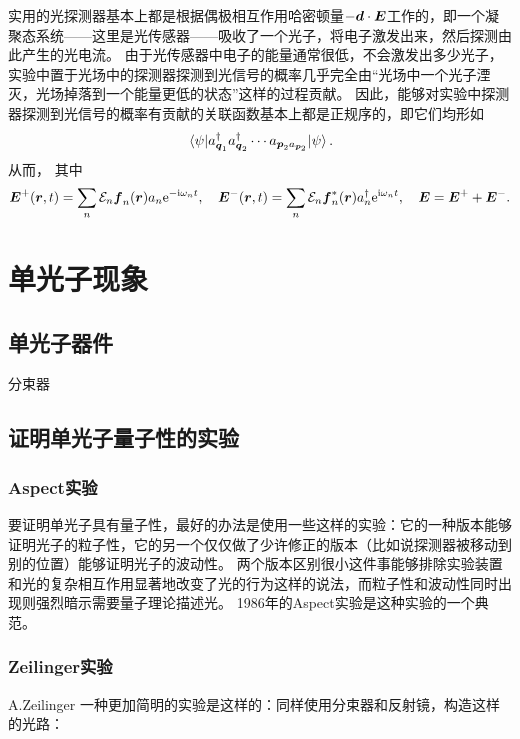 实用的光探测器基本上都是根据偶极相互作用哈密顿量$- \vb*{d} \cdot \vb*{E}$工作的，即一个凝聚态系统——这里是光传感器——吸收了一个光子，将电子激发出来，然后探测由此产生的光电流。
由于光传感器中电子的能量通常很低，不会激发出多少光子，实验中置于光场中的探测器探测到光信号的概率几乎完全由“光场中一个光子湮灭，光场掉落到一个能量更低的状态”这样的过程贡献。
因此，能够对实验中探测器探测到光信号的概率有贡献的关联函数基本上都是正规序的，即它们均形如
\[
    \mel{\psi}{a^\dagger_{\vb*{q}_1} a^\dagger_{\vb*{q}_2} \cdots a_{\vb*{p}_2 a_{\vb*{p}_2}}}{\psi}.
\]
从而，%
其中
\begin{equation}
    \vb*{E}^{+} (\vb*{r}, t) = \sum_n \mathcal{E}_n \vb*{f}_n(\vb*{r}) a_n \mathrm{e}^{-\mathrm{i} \omega_n t} , \quad \vb*{E}^{-} (\vb*{r}, t) = \sum_n \mathcal{E}_n \vb*{f}^*_n(\vb*{r}) a^\dagger_n \mathrm{e}^{\mathrm{i} \omega_n t}, \quad \vb*{E} = \vb*{E}^+ + \vb*{E}^-.
\end{equation}

\chapter{单光子现象}

\section{单光子器件}

分束器

\section{证明单光子量子性的实验}

\subsection{Aspect实验}

要证明单光子具有量子性，最好的办法是使用一些这样的实验：它的一种版本能够证明光子的粒子性，它的另一个仅仅做了少许修正的版本（比如说探测器被移动到别的位置）能够证明光子的波动性。
两个版本区别很小这件事能够排除实验装置和光的复杂相互作用显著地改变了光的行为这样的说法，而粒子性和波动性同时出现则强烈暗示需要量子理论描述光。
1986年的Aspect实验是这种实验的一个典范。

\subsection{Zeilinger实验}

A.Zeilinger
一种更加简明的实验是这样的：同样使用分束器和反射镜，构造这样的光路：

